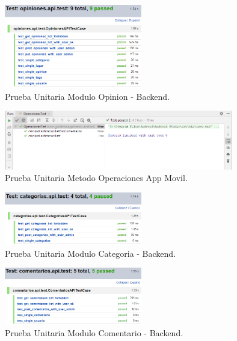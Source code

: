 \documentclass[12pt,letterpaper,openany]{book}
\begin{document}
\begin{figure}[H]
\begin{center}
\includegraphics[width=6cm]{./imagenes/Test/Backend/Test__opiniones_api_test}
\caption{Prueba Unitaria Modulo Opinion - Backend.}
\end{center}
\end{figure}

\begin{figure}[H]
\begin{center}
\includegraphics[width=10cm]{./imagenes/Test/OperacionesTest}
\caption{Prueba Unitaria Metodo Operaciones App Movil.}
\end{center}
\end{figure}

\begin{figure}[H]
\begin{center}
\includegraphics[width=6cm]{./imagenes/Test/Backend/Test__categorias_api_test}
\caption{Prueba Unitaria Modulo Categoria - Backend.}
\end{center}
\end{figure}

\begin{figure}[H]
\begin{center}
\includegraphics[width=6cm]{./imagenes/Test/Backend/Test__comentarios_api_test}
\caption{Prueba Unitaria Modulo Comentario - Backend.}
\end{center}
\end{figure}
\end{document}
